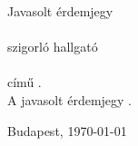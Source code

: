 \documentclass[a4paper,12pt]{article}
\begin{document}
\thispagestyle{empty}
\begin{center}
 \huge
 Javasolt érdemjegy\\
 \normalsize
 \vspace{1.5cm}
 \textbf{\jelolt}\\
 szigorló \kepzes{} hallgató\\
 \dolgozatcim\\
 című \dolgozattipusahoz{}.\\
 \vspace{1cm}
 A javasolt érdemjegy \textbf{\erdemjegy{}}.
\end{center}


\begin{flushleft}
\vspace*{1cm}
Budapest, \today
\end{flushleft}

\begin{flushright}
 \vspace*{1cm}
 \makebox[7cm]{\rule{6cm}{.4pt}}\\
 \makebox[7cm]{\emph{\biralo}}\\
\end{flushright}
\end{document}
